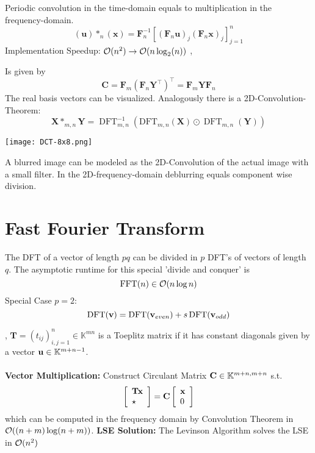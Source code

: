 Periodic convolution in the time-domain equals to multiplication in the frequency-domain.
$$
(\mathbf{u}) *_{n}(\mathbf{x})=\mathbf{F}_{n}^{-1}\left[\left(\mathbf{F}_{n} \mathbf{u}\right)_{j}\left(\mathbf{F}_{n} \mathbf{x}\right)_{j}\right]_{j=1}^{n}
$$
Implementation Speedup: $\mathcal{O}(n^2) \rightarrow \mathcal{O}(n \log_2(n))$
\sep

\Theorem[2D DFT] Is given by 
$$
\mathbf{C}=\mathbf{F}_{m}\left(\mathbf{F}_{n} \mathbf{Y}^{\top}\right)^{\top}=\mathbf{F}_{m} \mathbf{Y} \mathbf{F}_{n}
$$
The real basis vectors can be visualized.
Analogously there is a 2D-Convolution-Theorem:
$$
\mathbf{X} *_{m, n} \mathbf{Y}=\operatorname{DFT}_{m, n}^{-1}\left(\mathrm{DFT}_{m, n}(\mathbf{X}) \odot \operatorname{DFT}_{m, n}(\mathbf{Y})\right)
$$
\begin{center}
\texttt{[image: DCT-8x8.png]}
\end{center}

 A blurred image can be modeled as the 2D-Convolution of the actual image with a small filter. In the 2D-frequency-domain deblurring equals component wise division.

\section{Fast Fourier Transform}
The DFT of a vector of length $pq$ can be divided in $p$ DFT's of vectors of length $q$. The asymptotic runtime for this special 'divide and conquer' is
$$\operatorname{FFT}(n) \in \mathcal{O}(n \log n)$$
Special Case $p=2$: 
$$\operatorname{DFT}(\mathbf{v}) = \operatorname{DFT}(\mathbf{v}_{even})+s \operatorname{DFT}(\mathbf{v}_{odd})$$

\sep
{} $\mathbf{T}=\left(t_{i j}\right)_{i, j=1}^{n} \in \mathbb{K}^{mn}$
is a Toeplitz matrix if it has constant diagonals given by a vector $\mathbf{u} \in \mathbb{K}^{m+n-1}$.\\

 \\
\textbf{Vector Multiplication: }
Construct Circulant Matrix $\mathbf{C} \in \mathbb{K}^{m+n, m+n}$ s.t.
$$\left[\begin{array}{l} \mathbf{T}\mathbf{x} \\ \star \end{array}\right] = \mathbf{C} \left[\begin{array}{l} \mathbf{x} \\0\end{array}\right]$$
which can be computed in the frequency domain by Convolution Theorem in $\mathcal{O}((n+m)\log(n+m))$.
\textbf{LSE Solution: }
The Levinson Algorithm solves the LSE in $\mathcal{O}(n^2)$
